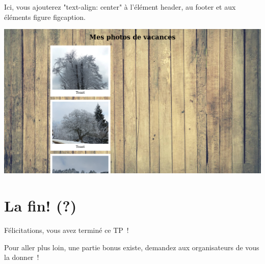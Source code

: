 Ici, vous ajouterez "text-align: center" à l'élément header, au footer et aux
éléments figure figcaption.
\begin{center}\includegraphics[width=.8\linewidth]{img/screenshot_text-align.png}\end{center}

\section{La fin! (?)}
Félicitations, vous avez terminé ce TP !

Pour aller plus loin, une partie bonus existe, demandez aux organisateurs de
vous la donner !

